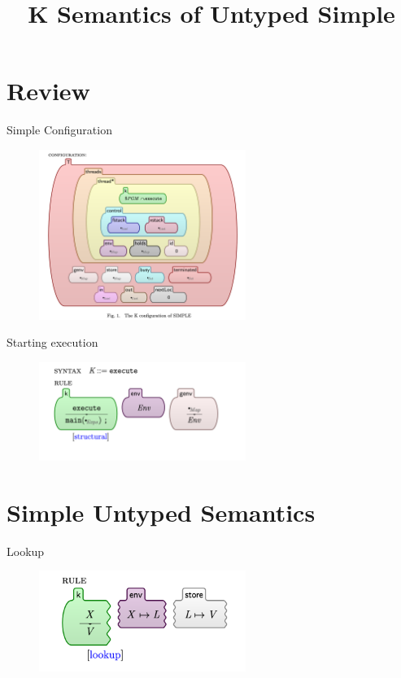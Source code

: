 \documentclass{beamer}
\title[CS 422 Programming Language Design]{K Semantics of Untyped Simple}
\date{}
\begin{document}
\section{Review}

\begin{frame}{Simple Configuration}

\begin{figure}[h]
    \includegraphics[width=0.6\textwidth]{configuration}
\end{figure}

\end{frame}

\begin{frame}{Starting execution}

\begin{figure}[h]
    \includegraphics[width=0.6\textwidth]{execute}
\end{figure}
\end{frame}

\section{Simple Untyped Semantics}

\begin{frame}{Lookup}
\begin{figure}[h]
    \includegraphics[width=0.6\textwidth]{lookup}
\end{figure}

\end{frame}
\end{document}
